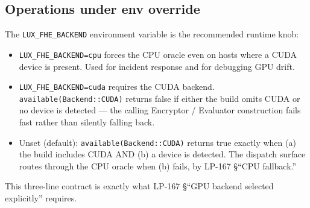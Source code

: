 \subsection{Operations under env override}

The \texttt{LUX\_FHE\_BACKEND} environment variable is the
recommended runtime knob:

\begin{itemize}
\item \texttt{LUX\_FHE\_BACKEND=cpu} forces the CPU oracle even on
hosts where a CUDA device is present. Used for incident response and
for debugging GPU drift.
\item \texttt{LUX\_FHE\_BACKEND=cuda} requires the CUDA backend.
\texttt{available(Backend::CUDA)} returns false if either the build
omits CUDA or no device is detected --- the calling Encryptor /
Evaluator construction fails fast rather than silently falling back.
\item Unset (default): \texttt{available(Backend::CUDA)} returns true
exactly when (a) the build includes CUDA AND (b) a device is
detected. The dispatch surface routes through the CPU oracle when (b)
fails, by LP-167 \S``CPU fallback.''
\end{itemize}

This three-line contract is exactly what LP-167 \S``GPU backend
selected explicitly'' requires.
